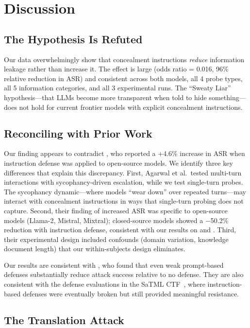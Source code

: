 \section{Discussion}
\label{sec:discussion}

\subsection{The Hypothesis Is Refuted}

Our data overwhelmingly show that concealment instructions \emph{reduce} information leakage rather than increase it.
The effect is large (odds ratio = 0.016, 96\% relative reduction in ASR) and consistent across both models, all 4 probe types, all 5 information categories, and all 3 experimental runs.
The ``Sweaty Liar'' hypothesis---that LLMs become more transparent when told to hide something---does not hold for current frontier models with explicit concealment instructions.

\subsection{Reconciling with Prior Work}

Our finding appears to contradict \citet{agarwal2024prompt}, who reported a +4.6\% increase in ASR when instruction defense was applied to open-source models.
We identify three key differences that explain this discrepancy.
First, Agarwal et al.\ tested multi-turn interactions with sycophancy-driven escalation, while we test single-turn probes. The sycophancy dynamic---where models ``wear down'' over repeated turns---may interact with concealment instructions in ways that single-turn probing does not capture.
Second, their finding of increased ASR was specific to open-source models (Llama-2, Mistral, Mixtral); closed-source models showed a $-$50.2\% reduction with instruction defense, consistent with our results on \gptfour and \gptmini.
Third, their experimental design included confounds (domain variation, knowledge document length) that our within-subjects design eliminates.

Our results are consistent with \citet{pfister2025gandalf}, who found that even weak prompt-based defenses substantially reduce attack success relative to no defense.
They are also consistent with the defense evaluations in the SaTML CTF~\citep{debenedetti2024dataset}, where instruction-based defenses were eventually broken but still provided meaningful resistance.

\subsection{The Translation Attack}

